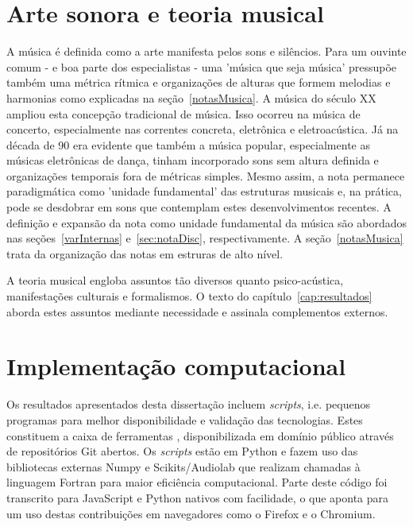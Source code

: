     \section{Arte sonora e teoria musical}

    A música é definida como a arte manifesta pelos sons e silêncios. Para um ouvinte comum - e boa parte dos especialistas - uma 'música que seja música' pressupõe também uma métrica rítmica e organizações de alturas que formem melodias e harmonias como explicadas na seção~\ref{notasMusica}. A música do século XX ampliou esta concepção tradicional de música. Isso ocorreu na música de concerto, especialmente nas correntes concreta, eletrônica e eletroacústica. Já na década de 90 era evidente que também a música popular, especialmente as músicas eletrônicas de dança, tinham incorporado sons sem altura definida e organizações temporais fora de métricas simples. Mesmo assim, a nota permanece paradigmática como 'unidade fundamental' das estruturas musicais e, na prática, pode se desdobrar em sons que contemplam estes desenvolvimentos recentes. A definição e expansão da nota como unidade fundamental da música são abordados nas seções~\ref{varInternas} e~\ref{sec:notaDisc}, respectivamente. A seção~\ref{notasMusica} trata da organização das notas em estruras de alto nível.\cite{Wisnick,Webern,Lerdahl,Cook,Lacerda} 

A teoria musical engloba assuntos tão diversos quanto psico-acústica, manifestações culturais e formalismos. O texto do capítulo~\ref{cap:resultados} aborda estes assuntos mediante necessidade e assinala complementos externos.\cite{Zamacois,Schoenberg,microsound}



    \section{Implementação computacional}
Os resultados apresentados desta dissertação incluem \emph{scripts}, i.e. pequenos programas para melhor disponibilidade e validação das tecnologias. Estes constituem a caixa de ferramentas \massa, disponibilizada em domínio público através de repositórios Git abertos.\cite{gitBook}
Os \emph{scripts} estão em Python e fazem uso das bibliotecas externas Numpy e Scikits/Audiolab que realizam chamadas à linguagem Fortran para maior eficiência computacional. Parte deste código foi transcrito para JavaScript e Python nativos com facilidade, o que aponta para um uso destas contribuições em navegadores como o Firefox e o Chromium.\cite{numpy,audiolab,tutPython,python}

